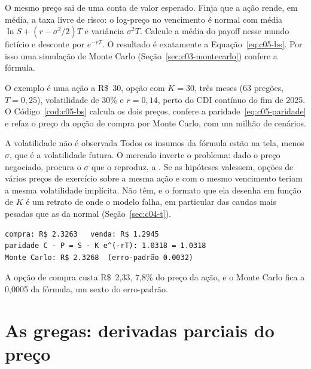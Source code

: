 \begin{intuicao}
O mesmo preço sai de uma conta de valor esperado. Finja que a ação rende, em média, a taxa livre de risco: o log-preço no vencimento é normal com média $\ln S + (r - \sigma^2/2)T$ e variância $\sigma^2 T$. Calcule a média do payoff nesse mundo fictício e desconte por $e^{-rT}$. O resultado é exatamente a Equação~\eqref{eq:c05-bs}. Por isso uma simulação de Monte Carlo (Seção~\ref{sec:c03-montecarlo}) confere a fórmula.
\end{intuicao}

O exemplo é uma ação a R\$~30, opção com $K = 30$, três meses (63 pregões, $T = 0,25$), volatilidade de 30\% e $r = 0,14$, perto do CDI contínuo do fim de 2025. O Código~\ref{cod:c05-bs} calcula os dois preços, confere a paridade~\eqref{eq:c05-paridade} e refaz o preço da opção de compra por Monte Carlo, com um milhão de cenários.

\begin{armadilha}{A volatilidade não é observada}
Todos os insumos da fórmula estão na tela, menos $\sigma$, que é a volatilidade futura. O mercado inverte o problema: dado o preço negociado, procura o $\sigma$ que o reproduz, a . Se as hipóteses valessem, opções de vários preços de exercício sobre a mesma ação e com o mesmo vencimento teriam a mesma volatilidade implícita. Não têm, e o formato que ela desenha em função de $K$ é um retrato de onde o modelo falha, em particular das caudas mais pesadas que as da normal (Seção~\ref{sec:c04-t}).
\end{armadilha}


\begin{lstlisting}[style=saida]
compra: R$ 2.3263   venda: R$ 1.2945
paridade C - P = S - K e^(-rT): 1.0318 = 1.0318
Monte Carlo: R$ 2.3268  (erro-padrão 0.0032)
\end{lstlisting}

A opção de compra custa R\$~2,33, 7,8\% do preço da ação, e o Monte Carlo fica a 0,0005 da fórmula, um sexto do erro-padrão.

\section{As gregas: derivadas parciais do preço}
\label{sec:c05-gregas}

